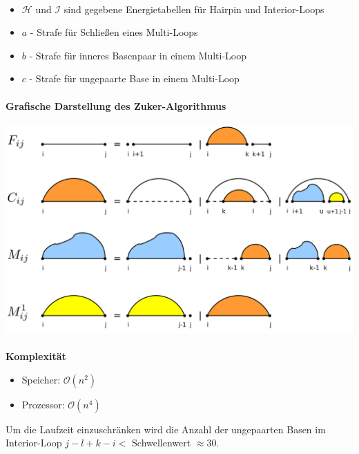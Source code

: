 \paragraph{}
\begin{itemize}
	\item[]$\mathcal{H}$ und $\mathcal{I}$ sind gegebene Energietabellen für Hairpin und Interior-Loops
	\item[]$a$ - Strafe f\"ur Schließen eines Multi-Loops
	\item[]$b$ - Strafe f\"ur inneres Basenpaar in einem Multi-Loop
	\item[]$c$ - Strafe f\"ur ungepaarte Base in einem Multi-Loop
\end{itemize}
\paragraph{}
 \textbf{Grafische Darstellung des Zuker-Algorithmus}\\\\
\includegraphics[scale=0.2]{lectures/160404_2/pix/zuker-lorenz-mod.png}\\
\paragraph{}
 \textbf{Komplexit\"at}
\begin{itemize}
	\item[] Speicher: $\mathcal{O}(n^2)$
	\item[] Prozessor: $\mathcal{O}(n^4)$
\end{itemize}
Um die Laufzeit einzuschr\"anken wird die Anzahl der ungepaarten Basen im Interior-Loop $j-l+k-i<$ Schwellenwert $\approx 30$.
